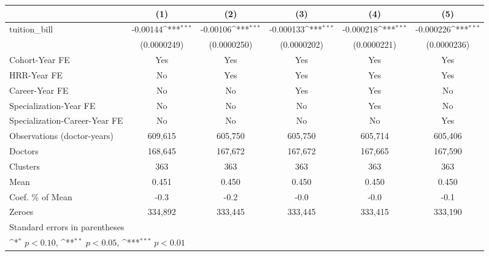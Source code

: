 {
\def\sym#1{\ifmmode^{#1}\else\(^{#1}\)\fi}
\begin{tabular}{l*{5}{c}}
\hline\hline
                    &\multicolumn{1}{c}{(1)}         &\multicolumn{1}{c}{(2)}         &\multicolumn{1}{c}{(3)}         &\multicolumn{1}{c}{(4)}         &\multicolumn{1}{c}{(5)}         \\
\hline
tuition\_bill        &    -0.00144\sym{***}&    -0.00106\sym{***}&   -0.000133\sym{***}&   -0.000218\sym{***}&   -0.000226\sym{***}\\
                    & (0.0000249)         & (0.0000250)         & (0.0000202)         & (0.0000221)         & (0.0000236)         \\
[1em]
Cohort-Year FE      &         Yes         &         Yes         &         Yes         &         Yes         &         Yes         \\
[1em]
HRR-Year FE         &          No         &         Yes         &         Yes         &         Yes         &         Yes         \\
[1em]
Career-Year FE      &          No         &          No         &         Yes         &         Yes         &          No         \\
[1em]
Specialization-Year FE&          No         &          No         &          No         &         Yes         &          No         \\
[1em]
Specialization-Career-Year FE&          No         &          No         &          No         &          No         &         Yes         \\
\hline
Observations (doctor-years)&     609,615         &     605,750         &     605,750         &     605,714         &     605,406         \\
Doctors             &     168,645         &     167,672         &     167,672         &     167,665         &     167,590         \\
Clusters            &         363         &         363         &         363         &         363         &         363         \\
Mean                &       0.451         &       0.450         &       0.450         &       0.450         &       0.450         \\
Coef. \% of Mean    &        -0.3         &        -0.2         &        -0.0         &        -0.0         &        -0.1         \\
Zeroes              &     334,892         &     333,445         &     333,445         &     333,415         &     333,190         \\
\hline\hline
\multicolumn{6}{l}{\footnotesize Standard errors in parentheses}\\
\multicolumn{6}{l}{\footnotesize \sym{*} \(p<0.10\), \sym{**} \(p<0.05\), \sym{***} \(p<0.01\)}\\
\end{tabular}
}
